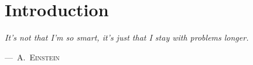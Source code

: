 \documentclass[10pt,openany,twoside,letterpaper,extrafontsizes]{memoir}
\newif\ifscaleforSixNine
\newcommand{\epioffset}{0mm}
\newcommand{\sixnineEpi}[3]{
\ifscaleforSixNine
\renewcommand{\blueboxheight}{#1}
\setlength{\epigraphwidth}{#2\textwidth}
\renewcommand{\epioffset}{#3}
\fi
}
\newcommand\myepigraph[3]{%
\vspace{#3}%
\epigraph{\textit{#1}}{#2}%
}
\newcommand{\blueboxheight}{10}
\begin{document}
\newcommand{\partpadding}{{\mbox{\hspace{0.1in}}}}

\renewcommand{\blueboxheight}{8}
\setlength{\epigraphwidth}{0.52\textwidth}
\renewcommand{\epioffset}{-26.4mm}
\sixnineEpi{8}{0.5}{-23.4mm}
\chapter*{Introduction}

\myepigraph{%
It's not that I'm so smart, it's just that I stay with problems longer.
}{
---~\textsc{A.~Einstein}
}{\epioffset}

\end{document}
